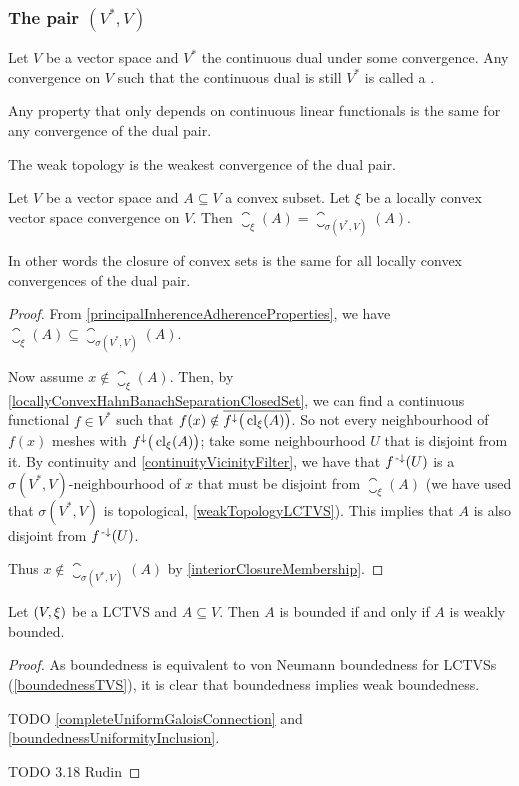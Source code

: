 \subsubsection{The pair $(V^*, V)$}
\begin{definition}
Let $V$ be a vector space and $V^*$ the continuous dual under some convergence. Any convergence on $V$ such that the continuous dual is still $V^*$ is called a .
\end{definition}
Any property that only depends on continuous linear functionals is the same for any convergence of the dual pair.

The weak topology is the weakest convergence of the dual pair.

\begin{proposition}
Let $V$ be a vector space and $A\subseteq V$ a convex subset. Let $\xi$ be a locally convex vector space convergence on $V$. Then $\closure_\xi(A) = \closure_{\sigma(V^*, V)}(A)$.
\end{proposition}
In other words the closure of convex sets is the same for all locally convex convergences of the dual pair.
\begin{proof}
From \ref{principalInherenceAdherenceProperties}, we have $\closure_\xi(A) \subseteq \closure_{\sigma(V^*, V)}(A)$.

Now assume $x\notin \closure_\xi(A)$. Then, by \ref{locallyConvexHahnBanachSeparationClosedSet}, we can find a continuous functional $f\in V^*$ such that $f(x) \notin \overline{f^{\downarrow}\big(\operatorname{cl}_\xi(A)\big)}$. So not every neighbourhood of $f(x)$ meshes with $f^{\downarrow}\big(\operatorname{cl}_\xi(A)\big)$; take some neighbourhood $U$ that is disjoint from it. By continuity and \ref{continuityVicinityFilter}, we have that $f^{{\text{\hspace{0.15em}-}\downarrow}}(U)$ is a $\sigma(V^*, V)$-neighbourhood of $x$ that must be disjoint from $\closure_\xi(A)$ (we have used that $\sigma(V^*, V)$ is topological, \ref{weakTopologyLCTVS}). This implies that $A$ is also disjoint from $f^{{\text{\hspace{0.15em}-}\downarrow}}(U)$.

Thus $x\notin \closure_{\sigma(V^*, V)}(A)$ by \ref{interiorClosureMembership}.
\end{proof}

\begin{proposition}
Let $\left( V,\xi \right)$ be a LCTVS and $A\subseteq V$. Then $A$ is bounded \textup{if and only if} $A$ is weakly bounded.
\end{proposition}
\begin{proof}
As boundedness is equivalent to von Neumann boundedness for LCTVSs (\ref{boundednessTVS}), it is clear that boundedness implies weak boundedness.

TODO \ref{completeUniformGaloisConnection} and \ref{boundednessUniformityInclusion}.

TODO 3.18 Rudin
\end{proof}



